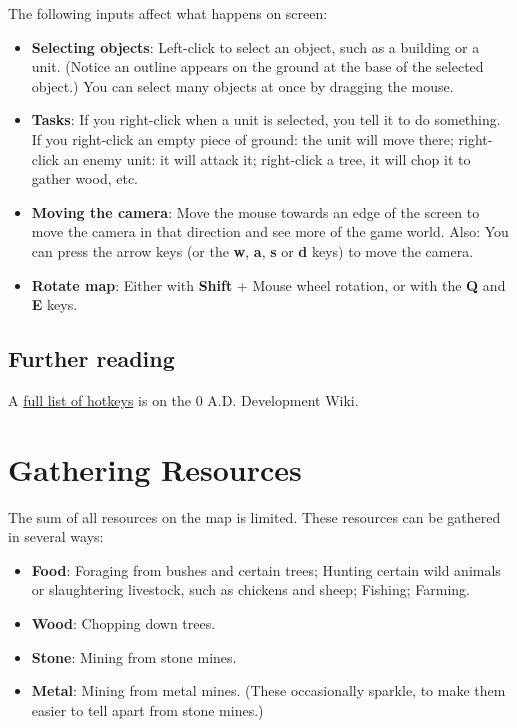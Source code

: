 \documentclass[a4paper,titlepage]{article}
\begin{document}
The following inputs affect what happens on screen:
\begin{itemize}
\item \textbf{Selecting objects}: Left-click to select an object, such as a building or a unit. (Notice an outline appears on the ground at the base of the selected object.) You can select many objects at once by dragging the mouse.
\item \textbf{Tasks}: If you right-click when a unit is selected, you tell it to do something. If you right-click an empty piece of ground: the unit will move there; right-click an enemy unit: it will attack it; right-click a tree, it will chop it to gather wood, etc.
\item \textbf{Moving the camera}: Move the mouse towards an edge of the screen to move the camera in that direction and see more of the game world. Also: You can press the arrow keys (or the \textbf{w}, \textbf{a}, \textbf{s} or \textbf{d} keys) to move the camera.
\item \textbf{Rotate map}: Either with \textbf{Shift} + Mouse wheel rotation, or with the \textbf{Q} and \textbf{E} keys.
\end{itemize}

\subsection*{Further reading}

A \href{http://trac.wildfiregames.com/wiki/HotKeys}{full list of hotkeys} is on the 0 A.D. Development Wiki.

\clearpage

\section{Gathering Resources}

The sum of all resources on the map is limited. These resources can be gathered in several ways:

\begin{itemize}
\item \textbf{Food}: Foraging from bushes and certain trees; Hunting certain wild animals or slaughtering livestock, such as chickens and sheep; Fishing; Farming.
\item \textbf{Wood}: Chopping down trees.
\item \textbf{Stone}: Mining from stone mines.
\item \textbf{Metal}: Mining from metal mines. (These occasionally sparkle, to make them easier to tell apart from stone mines.)
\end{itemize}
\end{document}
